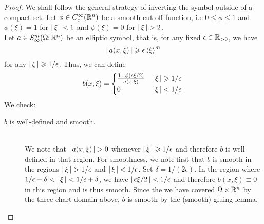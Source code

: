 \documentclass[12pt]{article}
\begin{document}
\begin{proof}
    We shall follow the general strategy of inverting the symbol outside of a compact set. Let $\phi \in C^\infty_c(\R^n)$ be a smooth cut off function, i.e $0 \leq \phi \leq 1$ and $ \phi(\xi) = 1$ for $\abs{\xi} < 1$ and $\phi(\xi) = 0 $ for $\abs{\xi} > 2$. \\
    
    Let $a \in S^{m}_\infty(\Omega; \R^n)$ be an elliptic symbol, that is, for any fixed $\epsilon \in \R_{> 0}$, we have 
    \[
    \abs{a(x, \xi)} \geq \epsilon \sym[\xi]^m
    \]
    for any $\abs{\xi} \geq 1/\epsilon$. Thus, we can define 
    \begin{align*}
    b(x, \xi) = 
    \begin{cases}
    \frac{1 - \phi( \epsilon \xi /2)}{a(x, \xi)} & \abs{\xi} \geq 1/ \epsilon \\
    0 & \abs{\xi} < 1 / \epsilon. 
    \end{cases}
    \end{align*}
    We check: 
    \begin{description}
        \item[$b$ is well-defined and smooth. ] \hfill \\
        We note that $\abs{a(x, \xi)} > 0$ whenever $\abs{\xi} \geq 1/\epsilon$ and therefore $b$ is well defined in that region. For smoothness, we note first that $b$ is smooth in the regions $\abs{\xi} > 1/ \epsilon$ and $\abs{\xi} < 1/\epsilon$. Set $\delta = 1/(2 \epsilon)$. In the region where $1/\epsilon - \delta < \abs{\xi} < 1/\epsilon + \delta$, we have $\abs{\epsilon \xi/ 2} < 1/\epsilon$ and therefore $b(x, \xi) \equiv 0$ in this region and is thus smooth. Since the we have covered $\Omega \times \R^n$ by the three chart domain above, $b$ is smooth by the (smooth) gluing lemma. 
        

\end{description}
\end{proof}
\end{document}
